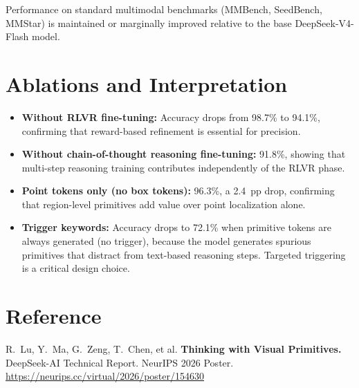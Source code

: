 \documentclass[10pt,twocolumn]{article}
\begin{document}
Performance on standard multimodal benchmarks (MMBench, SeedBench, MMStar) is maintained or marginally improved relative to the base DeepSeek-V4-Flash model.

\section{Ablations and Interpretation}

\begin{itemize}[leftmargin=1em,itemsep=2pt]
  \item \textbf{Without RLVR fine-tuning:} Accuracy drops from 98.7\% to 94.1\%, confirming that reward-based refinement is essential for precision.
  \item \textbf{Without chain-of-thought reasoning fine-tuning:} 91.8\%, showing that multi-step reasoning training contributes independently of the RLVR phase.
  \item \textbf{Point tokens only (no box tokens):} 96.3\%, a 2.4~pp drop, confirming that region-level primitives add value over point localization alone.
  \item \textbf{Trigger keywords:} Accuracy drops to 72.1\% when primitive tokens are always generated (no trigger), because the model generates spurious primitives that distract from text-based reasoning steps.
    Targeted triggering is a critical design choice.
\end{itemize}

\section*{Reference}
R.\ Lu, Y.\ Ma, G.\ Zeng, T.\ Chen, et al.
\textbf{Thinking with Visual Primitives.}
DeepSeek-AI Technical Report. NeurIPS 2026 Poster.
\url{https://neurips.cc/virtual/2026/poster/154630}
\end{document}
